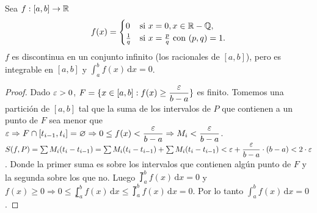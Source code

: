 \begin{eg}
  Sea $f: [a, b] \to \mathbb{R}$ \begin{equation}
    f(x) = \begin{cases}
      0           & \text{si } x = 0, x \in \mathbb{R} - \mathbb{Q},                    \\
      \frac{1}{q} & \text{si } x = \frac{p}{q} \text{ con } (p, q) = 1.
    \end{cases}
  \end{equation}
  $f$ es discontinua en un conjunto infinito (los racionales de $[a, b]$), pero es integrable en $[a, b]$ y $\int_a^b f(x)\, \mathrm{d}x = 0$.
  \begin{proof}
    Dado $\varepsilon > 0$, $F = \{ x \in [a, b] : f(x) \geq \dfrac{\varepsilon}{b-a} \}$ es finito. Tomemos una partición de $[a, b]$ tal que la suma de los intervalos de $P$ que contienen a un punto de $F$ sea menor que $\varepsilon \Rightarrow F \cap [t_{i-1}, t_i] = \varnothing \Rightarrow 0 \leq f(x) < \dfrac{\varepsilon}{b-a} \Rightarrow M_i < \dfrac{\varepsilon}{b-a}$. \\
    $S(f, P) = \sum M_i (t_i - t_{i-1}) = \sum M_i (t_i - t_{i-1}) + \sum M_i (t_i - t_{i-1}) < \varepsilon + \dfrac{\varepsilon}{b-a} \cdot (b-a) < 2 \cdot \varepsilon$. Donde la primer suma es sobre los intervalos que contienen algún punto de $F$ y la segunda sobre los que no. Luego $\upint_a^b f(x) \, \mathrm{d}x = 0$ y $f(x) \geq 0 \Rightarrow 0 \leq \lowint_a^b f(x) \, \mathrm{d}x \leq \upint_a^b f(x) \, \mathrm{d}x = 0$.
    Por lo tanto $\int_a^b f(x) \, \mathrm{d}x = 0$.
  \end{proof}
\end{eg}
